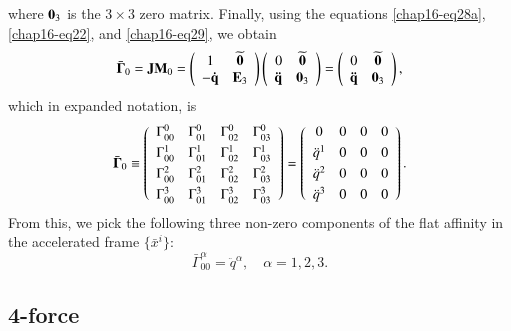 where $\mathbf{0}_3$ is the $3\times3$ zero matrix. Finally, using the equations  \eqref{chap16-eq28a}, \eqref{chap16-eq22}, and \eqref{chap16-eq29}, we obtain
\begin{equation}
\bar{\bm{\Gamma}}_0= {\mathbf{J}}{\mathbf{M}}_0=\left(\begin{array}{cc} 1 & \widetilde{\mathbf{0}}\\ -\mathbf{\dot{q}} & \mathbf{E}_3 \end{array}\right)
\left(\begin{array}{rc} 0 &\widetilde{\mathbf{0}} \\ \mathbf{\ddot{q}}  & \mathbf{0}_3 \end{array}\right) =\left(\begin{array}{cc}0&\widetilde{\mathbf{0}}\\
\mathbf{\ddot{q}}& \mathbf{0}_3 \end{array}\right),\label{chap16-eq30}
\end{equation}
which in expanded notation, is
\begin{equation}
\bar{\bm{\Gamma}}_0\equiv 
\left(\begin{array}{cccc}
\Gamma^0_{00}&\Gamma^0_{01}
&\Gamma^0_{02}&\Gamma^0_{03}\\[3pt]
\Gamma^1_{00}&\Gamma^1_{01}
&\Gamma^1_{02}&\Gamma^1_{03}\\[3pt]
\Gamma^2_{00}&\Gamma^2_{01}
&\Gamma^2_{02}&\Gamma^2_{03}\\[3pt]
\Gamma^3_{00}&\Gamma^3_{01}
&\Gamma^3_{02}&\Gamma^3_{03}
\end{array}\right)
= \left(\begin{array}{cccc} 
0&0&0&0\\[3pt]
{\ddot{q}}^1&0&0&0\\[3pt]
{\ddot{q}}^2&0&0&0\\[3pt]
{\ddot{q}}^3&0&0&0
\end{array}\right).\label{chap16-eq31}
\end{equation}
From this, we pick the following three non-zero components of the flat affinity in the accelerated frame $\{\bar{x}^i\}$:
\begin{equation}
\bar{\Gamma}^\alpha_{00}=\ddot{q}^\alpha,\quad \alpha=1,2,3.\label{chap16-eq32}
\end{equation}

\subsection{4-force}\label{chap16-sec6.6}

